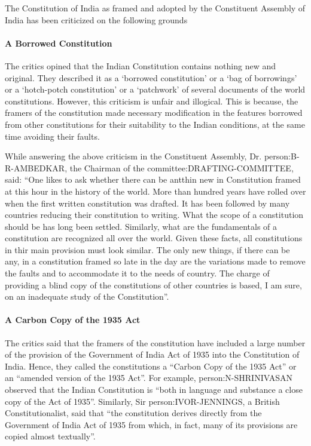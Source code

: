\begin{multicols}{2}
The Constitution of India as framed and adopted by the Constituent Assembly of India has been criticized on the following grounds

\paragraph{A Borrowed Constitution}

The critics opined that the Indian Constitution contains nothing new and original. They described it as a `borrowed constitution' or a `bag of borrowings' or a `hotch-potch constitution' or a `patchwork' of several documents of the world constitutions. However, this criticism is unfair and illogical. This is because, the framers of the constitution made necessary modification in the features borrowed from other constitutions for their suitability to the Indian conditions, at the same time avoiding their faults.

While answering the above criticism in the Constituent Assembly, Dr. \gls{person:B-R-AMBEDKAR}, the Chairman of the \gls{committee:DRAFTING-COMMITTEE}, said: ``One likes to ask whether there can be antthin new in Constitution framed at this hour in the history of the world. More than hundred years have rolled over when the first written constitution was drafted. It has been followed by many countries reducing their constitution to writing. What the scope of a constitution should be has long been settled. Similarly, what are the fundamentals of a constitution are recognized all over the world. Given these facts, all constitutions in thir main provision must look similar. The only new things, if there can be any, in a constitution framed so late in the day are the variations made to remove the faults and to accommodate it to the needs of country. The charge of providing a blind copy of the constitutions of other countries is based, I am sure, on an inadequate study of the Constitution''.

\paragraph{A Carbon Copy of the 1935 Act}
The critics said that the framers of the constitution have included a large number of the provision of the Government of India Act of 1935 into the Constitution of India. Hence, they called the constitutions a ``Carbon Copy of the 1935 Act'' or an ``amended version of the 1935 Act''. For example, \gls{person:N-SHRINIVASAN} observed that the Indian Constitution is ``both in language and substance a close copy of the Act of 1935''. Similarly, Sir \gls{person:IVOR-JENNINGS}, a British Constitutionalist, said that ``the constitution derives directly from the Government of India Act of 1935 from which, in fact, many of its provisions are copied almost textually''.


\end{multicols}
